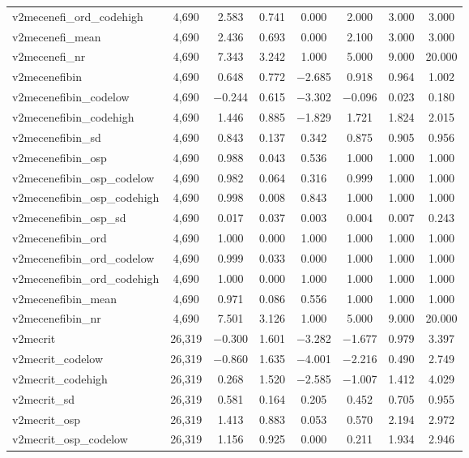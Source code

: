 \begin{table}[!htbp]
\begin{tabular}{@{\extracolsep{5pt}}lccccccc}
v2mecenefi\_ord\_codehigh & 4,690 & 2.583 & 0.741 & 0.000 & 2.000 & 3.000 & 3.000 \\ 
v2mecenefi\_mean & 4,690 & 2.436 & 0.693 & 0.000 & 2.100 & 3.000 & 3.000 \\ 
v2mecenefi\_nr & 4,690 & 7.343 & 3.242 & 1.000 & 5.000 & 9.000 & 20.000 \\ 
v2mecenefibin & 4,690 & 0.648 & 0.772 & $-$2.685 & 0.918 & 0.964 & 1.002 \\ 
v2mecenefibin\_codelow & 4,690 & $-$0.244 & 0.615 & $-$3.302 & $-$0.096 & 0.023 & 0.180 \\ 
v2mecenefibin\_codehigh & 4,690 & 1.446 & 0.885 & $-$1.829 & 1.721 & 1.824 & 2.015 \\ 
v2mecenefibin\_sd & 4,690 & 0.843 & 0.137 & 0.342 & 0.875 & 0.905 & 0.956 \\ 
v2mecenefibin\_osp & 4,690 & 0.988 & 0.043 & 0.536 & 1.000 & 1.000 & 1.000 \\ 
v2mecenefibin\_osp\_codelow & 4,690 & 0.982 & 0.064 & 0.316 & 0.999 & 1.000 & 1.000 \\ 
v2mecenefibin\_osp\_codehigh & 4,690 & 0.998 & 0.008 & 0.843 & 1.000 & 1.000 & 1.000 \\ 
v2mecenefibin\_osp\_sd & 4,690 & 0.017 & 0.037 & 0.003 & 0.004 & 0.007 & 0.243 \\ 
v2mecenefibin\_ord & 4,690 & 1.000 & 0.000 & 1.000 & 1.000 & 1.000 & 1.000 \\ 
v2mecenefibin\_ord\_codelow & 4,690 & 0.999 & 0.033 & 0.000 & 1.000 & 1.000 & 1.000 \\ 
v2mecenefibin\_ord\_codehigh & 4,690 & 1.000 & 0.000 & 1.000 & 1.000 & 1.000 & 1.000 \\ 
v2mecenefibin\_mean & 4,690 & 0.971 & 0.086 & 0.556 & 1.000 & 1.000 & 1.000 \\ 
v2mecenefibin\_nr & 4,690 & 7.501 & 3.126 & 1.000 & 5.000 & 9.000 & 20.000 \\ 
v2mecrit & 26,319 & $-$0.300 & 1.601 & $-$3.282 & $-$1.677 & 0.979 & 3.397 \\ 
v2mecrit\_codelow & 26,319 & $-$0.860 & 1.635 & $-$4.001 & $-$2.216 & 0.490 & 2.749 \\ 
v2mecrit\_codehigh & 26,319 & 0.268 & 1.520 & $-$2.585 & $-$1.007 & 1.412 & 4.029 \\ 
v2mecrit\_sd & 26,319 & 0.581 & 0.164 & 0.205 & 0.452 & 0.705 & 0.955 \\ 
v2mecrit\_osp & 26,319 & 1.413 & 0.883 & 0.053 & 0.570 & 2.194 & 2.972 \\ 
v2mecrit\_osp\_codelow & 26,319 & 1.156 & 0.925 & 0.000 & 0.211 & 1.934 & 2.946 \\ 

\end{tabular}
\end{table}
